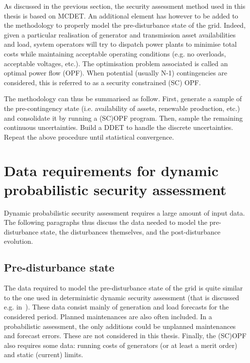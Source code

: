As discussed in the previous section, the security assessment method used in this thesis is based on MCDET. An additional element has however to be added to the methodology to properly model the pre-disturbance state of the grid. Indeed, given a particular realisation of generator and transmission asset availabilities and load, system operators will try to dispatch power plants to minimise total costs while maintaining acceptable operating conditions (e.g. no overloads, acceptable voltages, etc.). The optimisation problem associated is called an optimal power flow (OPF). When potential (usually N-1) contingencies are considered, this is referred to as a security constrained (SC) OPF.

The methodology can thus be summarised as follow. First, generate a sample of the pre-contingency state (i.e. availability of assets, renewable production, etc.) and consolidate it by running a (SC)OPF program. Then, sample the remaining continuous uncertainties. Build a DDET to handle the discrete uncertainties. Repeat the above procedure until statistical convergence.



\section{Data requirements for dynamic probabilistic security assessment}
\label{sec:DataRequirementsForDSA}

Dynamic probabilistic security assessment requires a large amount of input data. The following paragraphs thus discuss the data needed to model the pre-disturbance state, the disturbances themselves, and the post-disturbance evolution.

\subsection{Pre-disturbance state}

The data required to model the pre-disturbance state of the grid is quite similar to the one used in deterministic dynamic security assessment (that is discussed e.g. in~\cite{EurostagHPC}). These data consist mainly of generation and load forecasts for the considered period. Planned maintenances are also often included. In a probabilistic assessment, the only additions could be unplanned maintenances and forecast errors. These are not considered in this thesis. Finally, the (SC)OPF also requires some data: running costs of generators (or at least a merit order) and static (current) limits.

